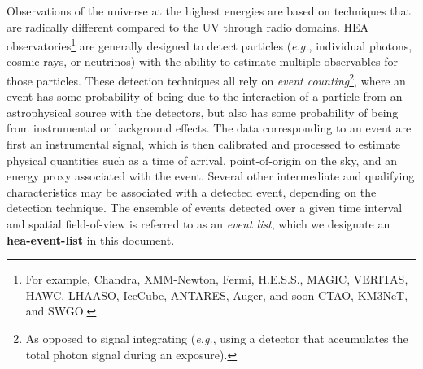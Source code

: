 \documentclass[11pt,a4paper]{ivoa}
\begin{document}
Observations of the universe at the highest energies are based on techniques that are radically different compared to the UV through radio domains. \gls{HEA} observatories\footnote{For example, Chandra, XMM-Newton, Fermi, H.E.S.S., MAGIC, VERITAS, HAWC, LHAASO, IceCube, ANTARES, Auger, and soon CTAO, KM3NeT, and SWGO.} are generally designed to detect particles ({\em e.g.\/}, individual photons, cosmic-rays, or neutrinos) with the ability to estimate multiple observables for those particles. These detection techniques all rely on {\em event counting\/}\footnote{As opposed to signal integrating ({\em e.g.\/}, using a detector that accumulates the total photon signal during an exposure).}, where an event has some probability of being due to the interaction of a particle from an astrophysical source with the detectors, but also has some probability of being from instrumental or background effects. The data corresponding to an event are first an instrumental signal, which is then calibrated and processed to estimate physical quantities such as a time of arrival, point-of-origin on the sky, and an energy proxy associated with the event. Several other intermediate and qualifying characteristics may be associated with a detected event, depending on the detection technique. The ensemble of events detected over a given time interval and spatial field-of-view is referred to as an {\em event list\/}, which we designate an {\bf hea-event-list} in this document.
\end{document}
